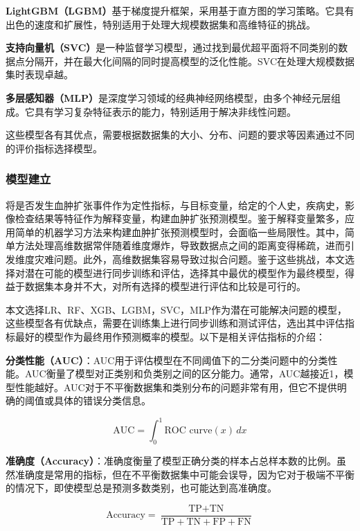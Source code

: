 \documentclass[bwprint]{gmcmthesis}
\begin{document}
\textbf{LightGBM（LGBM）}\cite{Ke2017LightGBMAH}基于梯度提升框架，采用基于直方图的学习策略。它具有出色的速度和扩展性，特别适用于处理大规模数据集和高维特征的挑战。

\textbf{支持向量机（SVC）}\cite{Cervantes2020ACS}是一种监督学习模型，通过找到最优超平面将不同类别的数据点分隔开，并在最大化间隔的同时提高模型的泛化性能。SVC在处理大规模数据集时表现卓越。

\textbf{多层感知器（MLP）}\cite{yun2019radiomic,ma2019mri}是深度学习领域的经典神经网络模型，由多个神经元层组成。它具有学习复杂特征表示的能力，特别适用于解决非线性问题。

这些模型各有其优点，需要根据数据集的大小、分布、问题的要求等因素通过不同的评价指标选择模型。

\subsubsection{模型建立}

将是否发生血肿扩张事件作为定性指标，与目标变量，给定的个人史，疾病史，影像检查结果等特征作为解释变量，构建血肿扩张预测模型。鉴于解释变量繁多，应用简单的机器学习方法来构建血肿扩张预测模型时，会面临一些局限性。其中，简单方法处理高维数据常伴随着维度爆炸，导致数据点之间的距离变得稀疏，进而引发维度灾难问题。此外，高维数据集容易导致过拟合问题。鉴于这些挑战，本文选择对潜在可能的模型进行同步训练和评估，选择其中最优的模型作为最终模型，得益于数据集本身并不大，对所有选择的模型进行评估和比较是可行的。

本文选择LR、RF、XGB、LGBM，SVC，MLP作为潜在可能解决问题的模型，这些模型各有优缺点，需要在训练集上进行同步训练和测试评估，选出其中评估指标最好的模型作为最终用作预测概率的模型。以下是相关评估指标的介绍：

\textbf{分类性能（AUC）}：AUC用于评估模型在不同阈值下的二分类问题中的分类性能。AUC衡量了模型对正类别和负类别之间的区分能力。通常，AUC越接近1，模型性能越好。AUC对于不平衡数据集和类别分布的问题非常有用，但它不提供明确的阈值或具体的错误分类信息。

\begin{equation}
\mathrm{AUC} = \int_0^1 \text{ROC curve}(x) \, dx
\end{equation}

\textbf{准确度（Accuracy）}：准确度衡量了模型正确分类的样本占总样本数的比例。虽然准确度是常用的指标，但在不平衡数据集中可能会误导，因为它对于极端不平衡的情况下，即使模型总是预测多数类别，也可能达到高准确度。

\begin{equation}
\text{Accuracy} = \frac{\text{TP} + \text{TN}}{\text{TP} + \text{TN} + \text{FP} + \text{FN}}
\end{equation}
\end{document}
